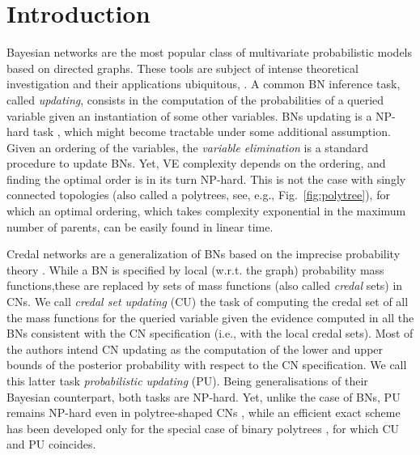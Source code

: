 \section{Introduction}\label{sec:intro}
Bayesian networks \citep[BNs,][]{2009:koller} are the most popular class of multivariate probabilistic models based on directed graphs. These tools are subject of intense theoretical investigation and their applications ubiquitous, \citep[e.g.,][]{landuyt2013,de2013}. A common BN inference task, called \emph{updating}, consists in the computation of the probabilities of a queried variable given an instantiation of some other variables. BNs updating is a NP-hard task \citep{cooper1990}, which might become tractable under some additional assumption. Given an ordering of the variables, the \emph{variable elimination} \citep[VE,][]{zhang1994simple} is a standard procedure to update BNs. Yet, VE complexity depends on the ordering, and finding the optimal order is in its turn NP-hard. This is not the case with singly connected topologies (also called a polytrees, see, e.g., Fig.~\ref{fig:polytree}), for which an optimal ordering, which takes complexity exponential in the maximum number of parents, can be easily found in linear time.%

Credal networks \citep[CNs,][]{cozman2000a} are a generalization of BNs based on the imprecise probability theory \citep{walley1991}. While a BN is specified by local (w.r.t. the graph) probability mass functions,these are replaced by sets of mass functions (also called \emph{credal} sets) in CNs. We call \emph{credal set updating} (CU) the task of computing the credal set of all the mass functions for the queried variable given the evidence computed in all the BNs consistent with the CN specification (i.e., with the local credal sets). Most of the authors intend CN updating as the computation of the lower and upper bounds of the posterior probability with respect to the CN specification. We call this latter task \emph{probabilistic updating} (PU). Being generalisations of their Bayesian counterpart, both tasks are NP-hard. Yet, unlike the case of BNs, PU remains NP-hard even in polytree-shaped CNs \citep{maua2014}, while an efficient exact scheme has been developed only for the special case of binary polytrees \citep{fagiuoli1998a}, for which CU and PU coincides. 

